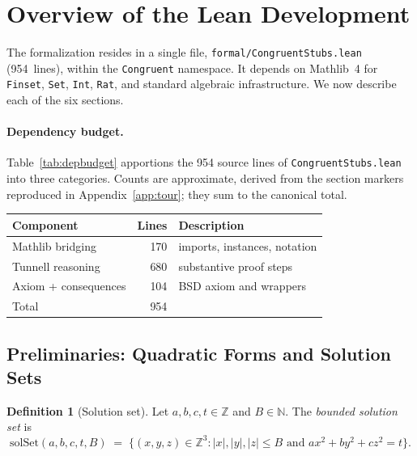 \documentclass[11pt,a4paper]{article}
\theoremstyle{definition}
\newtheorem{definition}[theorem]{Definition}
\newcommand{\Z}{\mathbb{Z}}
\newcommand{\N}{\mathbb{N}}
\newcommand{\lean}[1]{\texttt{#1}}
\newcommand{\solSet}{\mathrm{solSet}}
\begin{document}
\section{Overview of the Lean Development}\label{sec:lean}

The formalization resides in a single file,
\texttt{formal/CongruentStubs.lean} (954~lines), within the
\lean{Congruent} namespace.  It depends on Mathlib~4 for
\lean{Finset}, \lean{Set}, \lean{Int}, \lean{Rat}, and standard
algebraic infrastructure.  We now describe each of the six sections.

\paragraph{Dependency budget.}
Table~\ref{tab:depbudget} apportions the 954 source lines of
\texttt{CongruentStubs.lean} into three categories.  Counts are
approximate, derived from the section markers reproduced in
Appendix~\ref{app:tour}; they sum to the canonical total.

\begin{center}
\begin{tabular}{lrl}
\hline
Component & Lines & Description \\
\hline
Mathlib bridging      & 170 &
  imports, instances, notation \\
Tunnell reasoning     & 680 &
  substantive proof steps \\
Axiom + consequences  & 104 &
  BSD axiom and wrappers \\
\hline
Total                 & 954 & \\
\hline
\end{tabular}
\end{center}
\addtocounter{table}{1}
\label{tab:depbudget}

\subsection{Preliminaries: Quadratic Forms and Solution Sets}\label{sec:s1}

\begin{definition}[Solution set]\label{def:solset}
Let $a, b, c, t \in \Z$ and $B \in \N$.  The \emph{bounded solution
set} is
\[
  \solSet(a,b,c,t,B) \;=\;
  \bigl\{(x,y,z) \in \Z^3 : |x|,|y|,|z| \le B
    \text{ and } ax^2 + by^2 + cz^2 = t\bigr\}.
\]
\end{definition}
\end{document}
